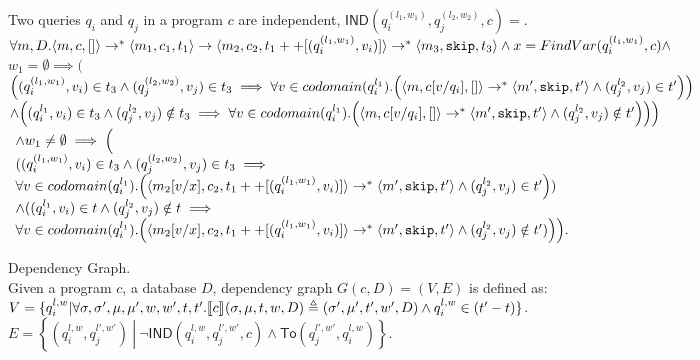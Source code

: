 \documentclass[a4paper,11pt]{article}
\begin{document}
\begin{defn}
Two queries $q_i$ and $q_j$ in a program $c$ are independent,
$\mathsf{IND}(q^{(l_1, w_1)}_i, q^{(l_2, w_2)}_j, c)=$.
$ \forall m, D. \langle m, c,  [] \rangle \rightarrow^{*} \langle m_1, c_1,
  t_1 \rangle \rightarrow \langle m_2, c_2,
  t_1++[(q^{(l_1, w_1)}_i, v_i)] \rangle \rightarrow^{*} \langle m_3, \mathtt{skip},
  t_3 \rangle \land x  = FindVar(q^{(l_1,
  w_1)}_i, c) \land $\\
$w_1 = \emptyset \implies  \Big (
$\\
$ 
\left((q^{(l_1, w_1)}_i, v_i) \in t_3 \land (q^{(l_2, w_2)}_j, v_j) \in t_3  \implies \forall v \in codomain(q^{l_1}_i). 
\left( \config{m, c[v/q_i],  []} \rightarrow^* \config{m', \eskip,  t'} \land (q^{l_2}_j, v_j) \in t'
\right)
\right)$ \\
$ \land
\left( (q^{l_1}_i, v_i) \in t_3 \land (q^{l_2}_j, v_j) \notin t_3  \implies \forall v\in codomain(q^{l_1}_i). 
\left( \config{m, c[v/q_i],  []} \rightarrow^{*} \config{m', \eskip,  t'} \land (q^{l_2}_j, v_j) \notin t'
\right)
\right)
\Big ) $ \\
$\begin{array}{l}
\land {w_1} \not = \emptyset \implies  \Big (  \\
 ( (q^{(l_1, w_1)}_i, v_i) \in t_3 \land (q^{(l_2, w_2)}_j, v_j)
  \in t_3  \implies \\
\forall v \in codomain(q^{l_1}_i). 
\left( \config{m_2[v/x], c_2, t_1++[(q^{(l_1, w_1)}_i, v_i)] } \rightarrow^{*} \config{m', \eskip,  t'}   \land (q^{l_2}_j, v_j) \in t'
\right )
 ) \\
 \land
( (q^{l_1}_i, v_i) \in t \land (q^{l_2}_j, v_j) \notin t
  \implies  \\
 \forall v\in codomain(q^{l_1}_i). 
\left( \config{m_2[v/x], c_2, t_1++[(q^{(l_1, w_1)}_i, v_i)] } \rightarrow^{*} \config{m', \eskip,  t'} \land (q^{l_2}_j, v_j) \notin t'
 )
\right )
\Big ).
\end{array}
$
\end{defn}
%

\begin{defn}
Dependency Graph.
\\
Given a program $c$, a database $D$, dependency graph $G(c,D) = (V, E)$ is defined as: \\
$V =\{q_i^{l,w} |\forall \sigma, \sigma', \mu,\mu' , w, w',t, t'. \llbracket c \rrbracket_{} (\sigma, \mu , t, w, D)  \triangleq  (\sigma' , \mu' , t', w' , D)  \land q_i^{l,w} \in {(t'-t)}  \}$.
\\
$E = \left\{(q_i^{l,w},q_j^{l',w'}) 
~ \left \vert ~ \neg \mathsf{IND}(q_i^{l,w},q_j^{l',w'}, c)
\land \mathsf{To}(q_j^{l',w'}, q_i^{l,w}) \right.\right\}$.
\end{defn}
%
%
%
\end{document}
